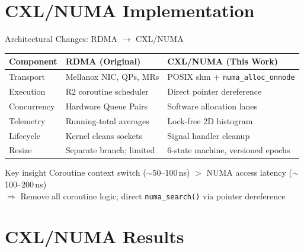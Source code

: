 \documentclass[aspectratio=169]{beamer}
\begin{document}
\section{CXL/NUMA Implementation}

\begin{frame}{Architectural Changes: RDMA $\to$ CXL/NUMA}
\centering
\small
\begin{tabular}{@{}lll@{}}
\toprule
\textbf{Component} & \textbf{RDMA (Original)} & \textbf{CXL/NUMA (This Work)} \\
\midrule
Transport & Mellanox NIC, QPs, MRs & POSIX shm + \texttt{numa\_alloc\_onnode} \\
Execution & R2 coroutine scheduler & Direct pointer dereference \\
Concurrency & Hardware Queue Pairs & Software allocation lanes \\
Telemetry & Running-total averages & Lock-free 2D histogram \\
Lifecycle & Kernel cleans sockets & Signal handler cleanup \\
Resize & Separate branch; limited & 6-state machine, versioned epochs \\
\bottomrule
\end{tabular}

\vspace{10pt}
\begin{block}{Key insight}
Coroutine context switch ($\sim$50--100\,ns) $>$ NUMA access latency ($\sim$100--200\,ns)\\
$\Rightarrow$ Remove all coroutine logic; direct \texttt{numa\_search()} via pointer dereference
\end{block}
\end{frame}

\section{CXL/NUMA Results}
\end{document}
